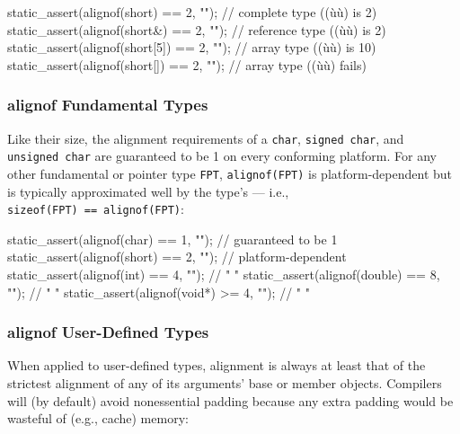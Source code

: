 \begin{emcppslisting}
static_assert(alignof(short)    == 2, "");  // complete type   ((ù{}ù) is 2)
static_assert(alignof(short&)   == 2, "");  // reference type  ((ù{}ù) is 2)
static_assert(alignof(short[5]) == 2, "");  // array type      ((ù{}ù) is 10)
static_assert(alignof(short[])  == 2, "");  // array type      ((ù{}ù) fails)
\end{emcppslisting}
    

\subsubsection[\lstinline!alignof! Fundamental Types]{{\SubsubsecCode alignof} Fundamental Types}\label{alignof-fundamental-types}

Like their size, the alignment requirements of a \lstinline!char!,
\lstinline!signed!~\lstinline!char!, and \lstinline!unsigned!~\lstinline!char! are
guaranteed to be 1 on every conforming
platform. For any other fundamental or pointer type \lstinline!FPT!,
\lstinline!alignof(FPT)! is platform-dependent but is typically approximated well by the type's  --- i.e.,
\lstinline!sizeof(FPT)!~\lstinline!==!~\lstinline!alignof(FPT)!:

\begin{emcppslisting}
static_assert(alignof(char)   == 1, "");  // guaranteed to be 1
static_assert(alignof(short)  == 2, "");  // platform-dependent
static_assert(alignof(int)    == 4, "");  //    "         "
static_assert(alignof(double) == 8, "");  //    "         "
static_assert(alignof(void*)  >= 4, "");  //    "         "
\end{emcppslisting}
    

\subsubsection[\lstinline!alignof! User-Defined Types]{{\SubsubsecCode alignof} User-Defined Types}\label{alignof-user-defined-types}

When applied to user-defined types, alignment is always at least that of
the strictest alignment of any of its arguments' base or member objects. 
%
Compilers will (by default) avoid nonessential padding because any
extra padding would be wasteful of (e.g., cache)
memory:

